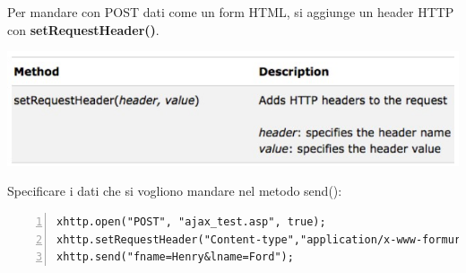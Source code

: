 Per mandare con POST dati come un form HTML, si aggiunge un header HTTP con \textbf{setRequestHeader()}.
\begin{center}
    \includegraphics[scale=0.6]{Images/TecnologieWeb/8/SetRequestHeader.jpg}
\end{center}
Specificare i dati che si vogliono mandare nel metodo send():
\begin{Verbatim}[numbers = left, frame = single]
xhttp.open("POST", "ajax_test.asp", true);
xhttp.setRequestHeader("Content-type","application/x-www-formurlencoded");
xhttp.send("fname=Henry&lname=Ford");
\end{Verbatim}

